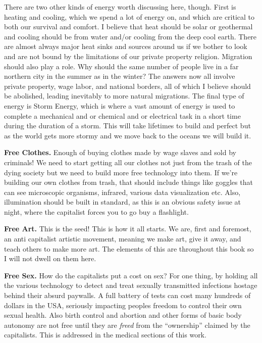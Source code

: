 There are two other kinds of energy worth discussing here, though. First
is heating and cooling, which we spend a lot of energy on, and which are
critical to both our survival and comfort. I believe that heat should be
solar or geothermal and cooling should be from water and/or cooling from
the deep cool earth. There are almost always major heat sinks and
sources around us if we bother to look and are not bound by the
limitations of our private property religion. Migration should also play
a role. Why should the same number of people live in a far northern city
in the summer as in the winter? The answers now all involve private
property, wage labor, and national borders, all of which I believe
should be abolished, leading inevitably to more natural migrations. The
final type of energy is Storm Energy, which is where a vast amount of
energy is used to complete a mechanical and or chemical and or
electrical task in a short time during the duration of a storm. This
will take lifetimes to build and perfect but as the world gets more
stormy and we move back to the oceans we will build it.

\textbf{Free Clothes.} Enough of buying clothes made by wage slaves and
sold by criminals! We need to start getting all our clothes not just
from the trash of the dying society but we need to build more free
technology into them. If we're building our own clothes from trash, that
should include things like goggles that can see microscopic organisms,
infrared, various data visualization etc. Also, illumination should be
built in standard, as this is an obvious safety issue at night, where
the capitalist forces you to go buy a flashlight.

\textbf{Free Art.} This is the seed! This is how it all starts. We are,
first and foremost, an anti capitalist artistic movement, meaning we
make art, give it away, and teach others to make more art. The elements
of this are throughout this book so I will not dwell on them here.

\textbf{Free Sex.} How do the capitalists put a cost on sex? For one
thing, by holding all the various technology to detect and treat
sexually transmitted infections hostage behind their absurd paywalls. A
full battery of tests can cost many hundreds of dollars in the USA,
seriously impacting peoples freedom to control their own sexual health.
Also birth control and abortion and other forms of basic body autonomy
are not free until they are \emph{freed} from the ``ownership'' claimed
by the capitalists. This is addressed in the medical sections of this
work.

